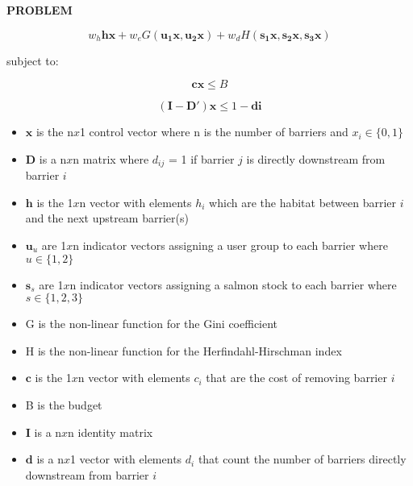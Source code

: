 \documentclass[12pt]{elsarticle}
\begin{document}
\begin{center} \textbf{PROBLEM} \end{center}


\begin{equation*}
w_h \boldsymbol{h}\boldsymbol{x}  + w_e G(\boldsymbol{u_1 x}, \boldsymbol{u_2 x}) + w_d H(\boldsymbol{s_1 x}, \boldsymbol{s_2 x}, \boldsymbol{s_3 x})
\end{equation*}

\noindent subject to:

\begin{equation*}
\boldsymbol{c x} \le B
\end{equation*}

\begin{equation*}
(\boldsymbol{I} - \boldsymbol{D}') \boldsymbol{x}  \le 1 - \boldsymbol{di}
\end{equation*}

\begin{itemize}
\item $\boldsymbol{x}$ is the n$x$1 control vector where n is the number of barriers and $x_i \in \{0, 1\}$
\item $\boldsymbol{D}$ is a n$x$n matrix where $d_{ij}$ = 1 if barrier $j$ is directly downstream from barrier $i$
\item $\boldsymbol{h}$ is the 1$x$n vector with elements $h_i$ which are the habitat between barrier $i$ and the next upstream barrier(s)
\item $\boldsymbol{u}_u$ are 1$x$n indicator vectors assigning a user group to each barrier where $u\in\{1, 2\}$
\item $\boldsymbol{s}_s$ are 1$x$n indicator vectors assigning a salmon stock to each barrier where $s\in\{1, 2, 3\}$
\item G is the non-linear function for the Gini coefficient
\item H is the non-linear function for the  Herfindahl-Hirschman index
\item $\boldsymbol{c}$ is the 1$x$n vector with elements $c_i$ that are the cost of removing barrier $i$ 
\item B is the budget
\item $\boldsymbol{I}$ is a n$x$n identity matrix
\item $\boldsymbol{d}$ is a n$x$1 vector with elements $d_i$ that count the number of barriers directly downstream from barrier $i$ 
\end{itemize}
\end{document}
